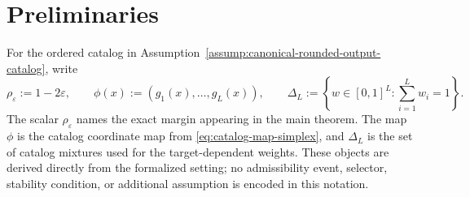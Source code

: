 \section{Preliminaries}
\label{sec:preliminaries}

For the ordered catalog in
Assumption~\ref{assump:canonical-rounded-output-catalog}, write
\begin{equation}
\rho_{\varepsilon}:=1-2\varepsilon,
\qquad
\phi(x):=(g_1(x),\ldots,g_L(x)),
\qquad
\Delta_L:=\left\{w\in[0,1]^L:\sum_{i=1}^Lw_i=1\right\}.
\label{eq:main-notation}
\end{equation}
The scalar \(\rho_{\varepsilon}\) names the exact margin appearing in the
main theorem.  The map \(\phi\) is the catalog coordinate map from
\eqref{eq:catalog-map-simplex}, and \(\Delta_L\) is the set of catalog
mixtures used for the target-dependent weights.  These objects are derived
directly from the formalized setting; no admissibility event, selector,
stability condition, or additional assumption is encoded in this notation.
